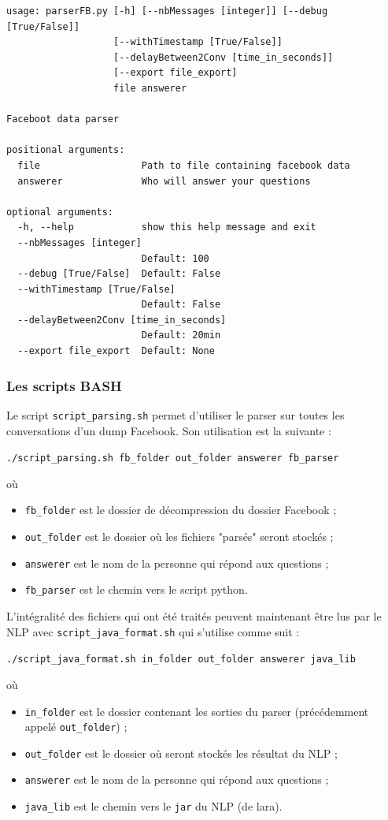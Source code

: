 \documentclass[10pt,a4paper]{article}
\begin{document}
\begin{verbatim}
usage: parserFB.py [-h] [--nbMessages [integer]] [--debug [True/False]]
                   [--withTimestamp [True/False]]
                   [--delayBetween2Conv [time_in_seconds]]
                   [--export file_export]
                   file answerer

Faceboot data parser

positional arguments:
  file                  Path to file containing facebook data
  answerer              Who will answer your questions

optional arguments:
  -h, --help            show this help message and exit
  --nbMessages [integer]
                        Default: 100
  --debug [True/False]  Default: False
  --withTimestamp [True/False]
                        Default: False
  --delayBetween2Conv [time_in_seconds]
                        Default: 20min
  --export file_export  Default: None

\end{verbatim}
\subsubsection{Les scripts BASH}
Le script \texttt{script\_parsing.sh} permet d'utiliser le parser sur toutes les conversations d'un dump Facebook. Son utilisation est la suivante :
\begin{center}
	\texttt{./script\_parsing.sh fb\_folder out\_folder answerer fb\_parser}
\end{center}
où
\begin{itemize}
	\item \texttt{fb\_folder} est le dossier de décompression du dossier Facebook ;
	\item \texttt{out\_folder} est le dossier où les fichiers "parsés" seront stockés ;
	\item \texttt{answerer} est le nom de la personne qui répond aux questions ;
	\item \texttt{fb\_parser} est le chemin vers le script python.
\end{itemize}
L'intégralité des fichiers qui ont été traités peuvent maintenant être lus par le NLP avec \texttt{script\_java\_format.sh} qui s'utilise comme suit :
\begin{center}
	\texttt{./script\_java\_format.sh in\_folder out\_folder answerer java\_lib}
\end{center}
où
\begin{itemize}
	\item \texttt{in\_folder} est le dossier contenant les sorties du parser (précédemment appelé \texttt{out\_folder}) ;
	\item \texttt{out\_folder} est le dossier où seront stockés les résultat du NLP ;
	\item \texttt{answerer} est le nom de la personne qui répond aux questions ;
	\item \texttt{java\_lib} est le chemin vers le \texttt{jar} du NLP (de lara).
\end{itemize}
\end{document}
